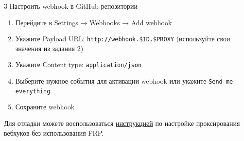 \documentclass[12pt,a4paper]{article}
\begin{document}
\begin{task}{3}
    Настроить webhook в GitHub репозитории
    
    \begin{enumerate}
        \item Перейдите в Settings → Webhooks → Add webhook
        \item Укажите Payload URL: \texttt{http://webhook.\$ID.\$PROXY} (используйте свои значения из задания 2)
        \item Укажите Content type: \texttt{application/json}
        \item Выберите нужное события для активации webhook или укажите \texttt{Send me everything}
        \item Сохраните webhook
    \end{enumerate}

    Для отладки можете воспользоваться \href{https://docs.github.com/en/webhooks/testing-and-troubleshooting-webhooks/testing-webhooks#testing-webhook-code-locally}{инструкцией} по настройке проксирования вебхуков без использования FRP.
\end{task}
\end{document}
